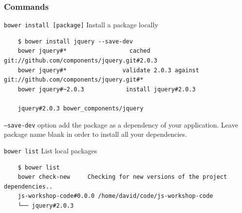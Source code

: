 \begin{frame}[fragile]
  \frametitle{Commands}

  \begin{block}{\texttt{bower install [package]}}
    Install a package locally
    {\tiny
    \begin{verbatim}
    $ bower install jquery --save-dev
    bower jquery#*                  cached git://github.com/components/jquery.git#2.0.3
    bower jquery#*                validate 2.0.3 against git://github.com/components/jquery.git#*
    bower jquery#~2.0.3            install jquery#2.0.3

    jquery#2.0.3 bower_components/jquery
    \end{verbatim}
    }
    \texttt{--save-dev} option add the package as a dependency of your application.
    Leave package name blank in order to install all your dependencies.
  \end{block}

  \pause

  \begin{block}{\texttt{bower list}}
    List local packages

    {\tiny
    \begin{verbatim}
    $ bower list
    bower check-new     Checking for new versions of the project dependencies..
    js-workshop-code#0.0.0 /home/david/code/js-workshop-code
    └── jquery#2.0.3
    \end{verbatim}
    }
  \end{block}
\end{frame}
